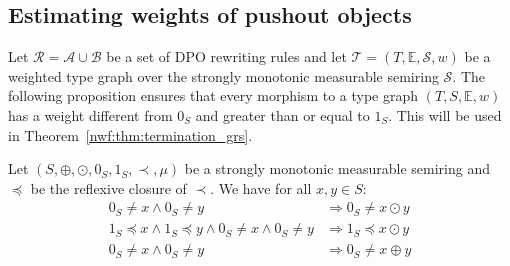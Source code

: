 \subsection{Estimating weights of pushout objects}
Let \( \mathcal{R} = \mathcal{A} \cup \mathcal{B} \) be a set of DPO rewriting rules and let \(\mathcal{T} = (T, \mathbb{E}, \mathcal{S}, w)\) be a weighted type graph over the strongly monotonic measurable semiring $\mathcal{S}$.
The following proposition ensures that every morphism to a type graph $(T,S,\mathbb{E}, w)$ has a weight different from $0_S$ and greater than or equal to $1_S$.
This will be used in Theorem~\ref{nwf:thm:termination_grs}.
\begin{proposition}  
    \label{prop_endrullis_2d7}
    Let $(S, \oplus, \odot, 0_S, 1_S, \prec, \mu)$ be a strongly monotonic measurable semiring and $\preceq$ be the reflexive closure of $\prec$. We have for all $x,y\in S$:
    \begin{align*}
        0_S \neq x \land 0_S \neq y 
        &\Rightarrow 0_S \neq x \odot y 
        \tag{S10} \label{eq:prop_neq0_mul_neq0}  
        \\
        1_S \preceq x \land 1_S \preceq y \land 0_S \neq x \land 0_S \neq y  
        &\Rightarrow
         1_S \preceq x \odot y 
         \tag{S11} \label{eq:prop_neg0_ge1_mul_ge1}  
         \\
         0_S \neq x \land 0_S \neq y   
         &\Rightarrow 0_S \neq x \oplus y
         \tag{S12} \label{eq:prop_neq0_plus_neq0}  
    \end{align*}
\end{proposition}

